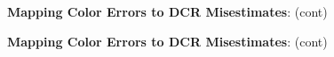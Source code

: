 \documentclass[DM,toc]{lsstdoc}
\begin{document}
\begin{figure}
    \ContinuedFloat
    \centering
    \caption[]{\textbf{Mapping Color Errors to DCR Misestimates}: (cont)}
    \label{dcrerr2}
\end{figure}
\begin{figure}
    \ContinuedFloat
    \centering
    \caption[]{\textbf{Mapping Color Errors to DCR Misestimates}: (cont)}
    \label{dcrerr2}
\end{figure}
\end{document}
